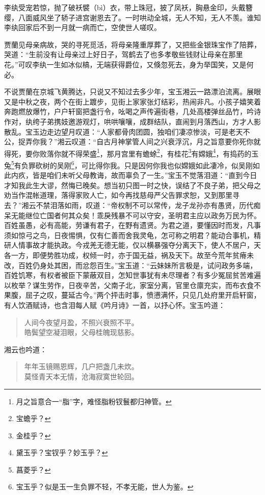 \documentclass[12pt,oneside]{book}
\newenvironment{shici}{%
\begin{verse}%
\centering\large\hspace{12pt}}%
{\end{verse}}
\begin{document}
李纨受宠若惊，抛了破袄襞（bì）衣，带上珠冠，披了凤袄，胸悬金印，头戴簪缨，八面威风坐了轿子进宫谢恩去了。一时哄动全城，无人不知，无人不羡。谁知李纨回家后不到一月就一病而亡，空使世人嗟叹。

贾蘭见母亲病故，哭的寻死觅活，将母亲隆重厚葬了，又把些金银珠宝作了陪葬，哭道：“生前没有让母亲过上好日子，驾鹤去了也多孝敬些钱财让母亲在那里花。”可叹李纨一生如冰似槁，无端获得爵位，又倏忽死去，身为举国笑，又是何必。

不说贾蘭在京城飞黄腾达，只说又不知过去多少年，宝玉湘云一路漂泊流离。展眼又是中秋之夜，两个在街上踱步，见街上家家张灯结彩，热闹非凡。小孩子嬉笑着奔跑燃放爆竹，户户轩窗把盏行令，吆喝之声传遍街巷，几处高楼弹丝品竹，吟诗作对，纨绔子弟携妓邀游观灯，哄哄嚷嚷，成群结队，直闹到月落西山，方才人影散乱。宝玉边走边望月叹道：“人家都骨肉团圆，独咱们凄凉惨淡，可是老天不公，捉弄你我？”湘云叹道：“自古月神掌管人间之兴衰浮沉，月之旨意要你死你就得死，要你败落你就不得荣盛\footnote{月之旨意合一“脂”字，难怪脂粉钗鬟都归神管。}，那月宫里有蟾蜍\footnote{宝蟾乎？}，有桂花\footnote{金桂乎？}有嫦娥\footnote{黛玉乎？宝钗乎？妙玉乎？}，有捣药的玉兔\footnote{菖菱乎？}有负罪砍树的吴刚\footnote{宝玉乎？似是玉一生负罪不轻，不孝无能，世人为鉴。}，可比得你我。只是因何你我也似嫦娥如此凄冷，似吴刚如此内疚，皆是咱们未听父母教诲，故而辜负了一生。”宝玉不觉落泪道：“直到今日才知我此生大谬，然悔已晚矣。想当初只图一时之快，误结了不良子弟，把父母之劝当作混帐道理，落得家败人亡，如今再找慈母严父告罪求恕，又到那里寻去？”湘云不禁泪落如雨，叹道：“帝权制不可以常传，龙子龙孙亦有愚贤，历代痴呆无能继位亡国者何其众矣！乖戾残暴不可以守安，圣明君主应以政务万民为怀。百姓虽愚，必有高能，劳谦有君子，在野有遗贤。为君之道，要懂因时而发，凡事须如惊弓之鸟，日夜惕惧，仅有仁善而舍我灵龟，怎可称之明君？能动合事机，精研人情事故才能执政。今戎羌无德无能，仅以横暴强夺分离天下，使人不居户，天各一方，即便势胜功成，权倾一时，亦于国无益，祸及天下。故至今荒年贫瘠未改，百姓仍身处其困，而忿怨百生。”宝玉道：“云妹妹所言极是，试问政务多端，百姓饥寒，有权者被臣下蒙蔽双目，怎知世事犹有未尽理者？有多少冤屈贫苦难遍以枚举？谋生劳作，日夜辛苦，父南子北，家室分离，官里仓廪充实，而布衣食不果腹，屈子之叹，蔓延古今。”两个抨击时事，愤懑满怀，只见几处府里开启轩窗，有人饮酒赋诗，也含泪每人赋《吟月诗》一首，以抒心怀。宝玉吟道：

\begin{shici}
人间今夜望月盈，不照兴衰照不平。\\
皓鬓望空凝泪眼，父母桂魄现慈影。
\end{shici}

湘云也吟道：

\begin{shici}
年年玉镜赐恩辉，几户把盏几未炊。\\
莫怪青天本无情，沧海寂寞世轮回。
\end{shici}
\end{document}
